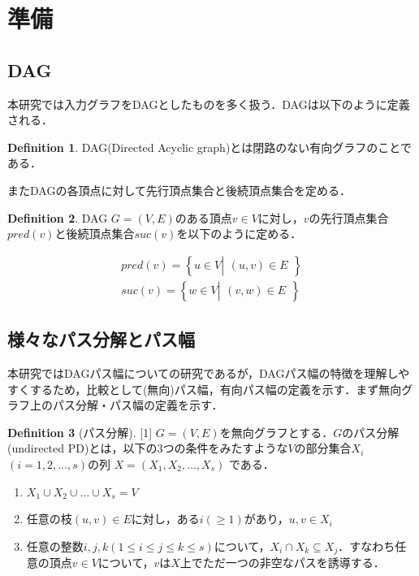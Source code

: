 \documentclass[master]{kuisthesis}		%
\theoremstyle{plain}
\theoremstyle{definition}
\newtheorem{definition*}{Definition}
\begin{document}
\section{準備} %


\subsection{DAG} %
本研究では入力グラフをDAGとしたものを多く扱う．DAGは以下のように定義される．

\begin{definition*}
    DAG(Directed Acyclic graph)とは閉路のない有向グラフのことである．
\end{definition*}

またDAGの各頂点に対して先行頂点集合と後続頂点集合を定める．


\begin{definition*}
    DAG $G=(V, E)$のある頂点$v \in V$に対し，$v$の先行頂点集合$pred(v)$と後続頂点集合$suc(v)$を以下のように定める．
    
    \begin{align*}
        pred(v) = \left\{ u \in V \left |
        \begin{array}{l}
            \text{$(u, v) \in E$}
        \end{array}
        \right. \right\}\\
        suc(v) = \left\{ w \in V \left |
        \begin{array}{l}
            \text{$(v, w) \in E$}
        \end{array}
        \right. \right\}
    \end{align*}
    
\end{definition*}




\subsection{様々なパス分解とパス幅} %
本研究ではDAGパス幅についての研究であるが，DAGパス幅の特徴を理解しやすくするため，比較として(無向)パス幅，有向パス幅の定義を示す．まず無向グラフ上のパス分解・パス幅の定義を示す．

\begin{definition*}[パス分解][1]
    $G=(V, E)$を無向グラフとする．$G$のパス分解(undirected PD)とは，以下の3つの条件をみたすような$V$の部分集合$X_i$ $(i = 1, 2,  \dots, s)$の列 $X=(X_1, X_2,  \dots, X_s)$ である．
    
    \begin{enumerate}
        \item $ X_1 \cup X_2 \cup \dots \cup X_s = V $ 
        \item 任意の枝$(u, v) \in E $に対し，ある$i(\geq 1)$があり，$u, v \in X_i$
        \item 任意の整数$ i, j, k (1 \leq i \leq j \leq k \leq s)$について，$X_i \cap X_k \subseteq X_j$．すなわち任意の頂点$v \in V$について，$v$は$X$上でただ一つの非空なパスを誘導する．
    \end{enumerate}
\end{definition*}
\end{document}
